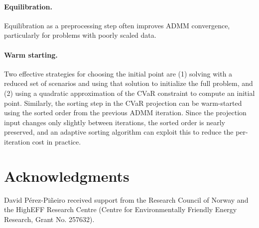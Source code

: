 \documentclass[12pt]{article}
\begin{document}
\paragraph{Equilibration.}
Equilibration as a preprocessing step often improves
ADMM convergence, particularly for problems with poorly scaled data.

\paragraph{Warm starting.}
Two effective strategies for choosing the initial point are
(1) solving with a reduced set of scenarios and using that solution to initialize the full problem,
and (2) using a quadratic approximation of the CVaR constraint to compute an initial point.
Similarly, the sorting step in the CVaR projection can be warm-started
using the sorted order from the previous ADMM iteration.
Since the projection input changes only slightly between iterations, the
sorted order is nearly preserved, and an adaptive sorting algorithm can
exploit this to reduce the per-iteration cost in practice.

\section*{Acknowledgments}
David Pérez-Piñeiro received support from the Research Council of Norway and the
HighEFF Research Centre (Centre for Environmentally Friendly Energy Research,
Grant No. 257632).

\clearpage
\printbibliography
\end{document}
